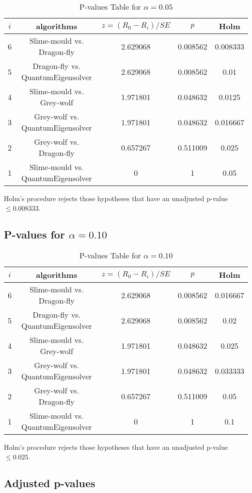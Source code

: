 \documentclass[a4paper,10pt]{article}
\begin{document}
\begin{landscape}
\begin{table}[!htp]
\centering\scriptsize
\begin{tabular}{ccccc}
$i$&algorithms&$z=(R_0 - R_i)/SE$&$p$&Holm\\
\hline6&Slime-mould vs. Dragon-fly&2.629068&0.008562&0.008333\\
5&Dragon-fly vs. QuantumEigensolver&2.629068&0.008562&0.01\\
4&Slime-mould vs. Grey-wolf&1.971801&0.048632&0.0125\\
3&Grey-wolf vs. QuantumEigensolver&1.971801&0.048632&0.016667\\
2&Grey-wolf vs. Dragon-fly&0.657267&0.511009&0.025\\
1&Slime-mould vs. QuantumEigensolver&0&1&0.05\\
\hline
\end{tabular}
\caption{P-values Table for $\alpha=0.05$}
\end{table}Holm's procedure rejects those hypotheses that have an unadjusted p-value $\le0.008333$.

\pagebreak

\subsection{P-values for $\alpha=0.10$}

\begin{table}[!htp]
\centering\scriptsize
\begin{tabular}{ccccc}
$i$&algorithms&$z=(R_0 - R_i)/SE$&$p$&Holm\\
\hline6&Slime-mould vs. Dragon-fly&2.629068&0.008562&0.016667\\
5&Dragon-fly vs. QuantumEigensolver&2.629068&0.008562&0.02\\
4&Slime-mould vs. Grey-wolf&1.971801&0.048632&0.025\\
3&Grey-wolf vs. QuantumEigensolver&1.971801&0.048632&0.033333\\
2&Grey-wolf vs. Dragon-fly&0.657267&0.511009&0.05\\
1&Slime-mould vs. QuantumEigensolver&0&1&0.1\\
\hline
\end{tabular}
\caption{P-values Table for $\alpha=0.10$}
\end{table}Holm's procedure rejects those hypotheses that have an unadjusted p-value $\le0.025$.

\pagebreak

\subsection{Adjusted p-values}


\end{landscape}
\end{document}
